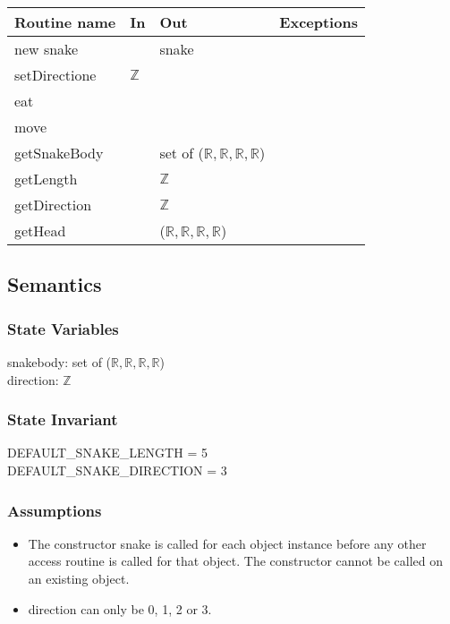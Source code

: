 \documentclass[12pt, titlepage]{article}
\begin{document}
\begin{tabular}{| l | l | l | l |}
\hline
\textbf{Routine name} & \textbf{In} & \textbf{Out} & \textbf{Exceptions}\\
\hline
new snake &  & snake & \\
\hline
setDirectione & $\mathbb{Z}$ &  & \\
\hline
eat &   &  & \\
\hline
move &   &  & \\
\hline
getSnakeBody &  & set of ($\mathbb{R}, \mathbb{R}, \mathbb{R}, \mathbb{R}$)  & \\
\hline
getLength &  & $\mathbb{Z}$  & \\
\hline
getDirection &  & $\mathbb{Z}$  & \\
\hline
getHead &  & ($\mathbb{R}, \mathbb{R}, \mathbb{R}, \mathbb{R}$)  & \\
\hline
\end{tabular}


\subsection* {Semantics}

\subsubsection* {State Variables}

snakebody: set of ($\mathbb{R}, \mathbb{R}, \mathbb{R}, \mathbb{R}$)\\
direction: {$\mathbb{Z}$}\\

\subsubsection* {State Invariant}

DEFAULT\_SNAKE\_LENGTH = 5\\
DEFAULT\_SNAKE\_DIRECTION = 3

\subsubsection* {Assumptions}
\begin{itemize}
\item The constructor snake is called for each object instance before any other
access routine is called for that object.  The constructor cannot be called on
an existing object.
\item direction can only be 0, 1, 2 or 3.
\end{itemize}
\end{document}
